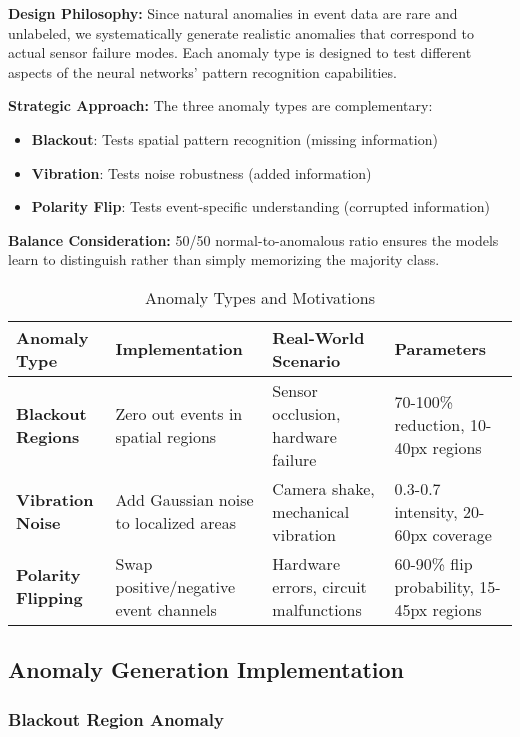 \documentclass[12pt,a4paper]{article}
\begin{document}
\textbf{Design Philosophy:} Since natural anomalies in event data are rare and unlabeled, we systematically generate realistic anomalies that correspond to actual sensor failure modes. Each anomaly type is designed to test different aspects of the neural networks' pattern recognition capabilities.

\textbf{Strategic Approach:} The three anomaly types are complementary:
\begin{itemize}
    \item \textbf{Blackout}: Tests spatial pattern recognition (missing information)
    \item \textbf{Vibration}: Tests noise robustness (added information)
    \item \textbf{Polarity Flip}: Tests event-specific understanding (corrupted information)
\end{itemize}

\textbf{Balance Consideration:} 50/50 normal-to-anomalous ratio ensures the models learn to distinguish rather than simply memorizing the majority class.

\begin{table}[H]
\centering
\begin{tabular}{|p{3cm}|p{4cm}|p{4cm}|p{3cm}|}
\hline
\textbf{Anomaly Type} & \textbf{Implementation} & \textbf{Real-World Scenario} & \textbf{Parameters} \\
\hline
\textbf{Blackout Regions} & Zero out events in spatial regions & Sensor occlusion, hardware failure & 70-100\% reduction, 10-40px regions \\
\hline
\textbf{Vibration Noise} & Add Gaussian noise to localized areas & Camera shake, mechanical vibration & 0.3-0.7 intensity, 20-60px coverage \\
\hline
\textbf{Polarity Flipping} & Swap positive/negative event channels & Hardware errors, circuit malfunctions & 60-90\% flip probability, 15-45px regions \\
\hline
\end{tabular}
\caption{Anomaly Types and Motivations}
\end{table}

\subsection{Anomaly Generation Implementation}

\subsubsection{Blackout Region Anomaly}
\end{document}
